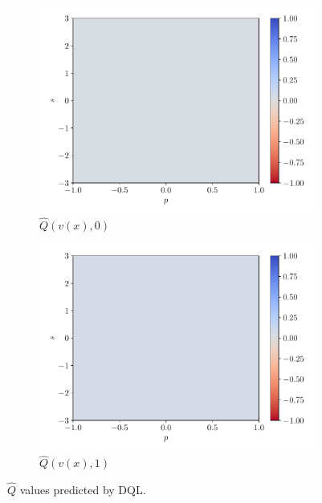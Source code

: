 \documentclass[a4paper, 12pt]{article}
\begin{document}
    \begin{figure}[h]
        \centering
        \begin{subfigure}{0.49\textwidth}
            \centering
            \includegraphics[width=\textwidth]{resources/pdf/2_dql_q0.pdf}
            \caption{$\hat{Q}(v(x), 0)$}
        \end{subfigure}
        \hfill
        \begin{subfigure}{0.49\textwidth}
            \centering
            \includegraphics[width=\textwidth]{resources/pdf/2_dql_q1.pdf}
            \caption{$\hat{Q}(v(x), 1)$}
        \end{subfigure}
        \caption{$\hat{Q}$ values predicted by DQL.}
        \label{fig:dql.hat.q}
    \end{figure}
    
\end{document}
